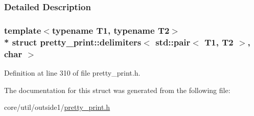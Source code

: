 \subsubsection{Detailed Description}
\subsubsection*{template$<$typename T1, typename T2$>$\\*
struct pretty\+\_\+print\+::delimiters$<$ std\+::pair$<$ T1, T2 $>$, char $>$}



Definition at line 310 of file pretty\+\_\+print.\+h.



The documentation for this struct was generated from the following file\+:\begin{DoxyCompactItemize}
\item 
core/util/outside1/\hyperlink{pretty__print_8h}{pretty\+\_\+print.\+h}\end{DoxyCompactItemize}
